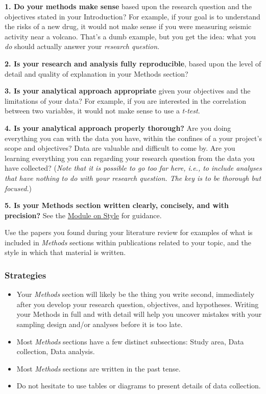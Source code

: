 \documentclass[]{book}
\begin{document}
\textbf{1. Do your methods make sense} based upon the research question and the objectives stated in your Introduction? For example, if your goal is to understand the risks of a new drug, it would not make sense if you were measuring seismic activity near a volcano. That's a dumb example, but you get the idea: what you \emph{do} should actually answer your \emph{research question}.

\textbf{2. Is your research and analysis fully reproducible}, based upon the level of detail and quality of explanation in your Methods section?

\textbf{3. Is your analytical approach appropriate} given your objectives and the limitations of your data? For example, if you are interested in the correlation between two variables, it would not make sense to use a \emph{t-test}.

\textbf{4. Is your analytical approach properly thorough?} Are you doing everything you can with the data you have, within the confines of a your project's scope and objectives? Data are valuable and difficult to come by. Are you learning everything you can regarding your research question from the data you have collected? (\emph{Note that it is possible to go too far here, i.e., to include analyses that have nothing to do with your research question. The key is to be thorough but focused.})

\textbf{5. Is your Methods section written clearly, concisely, and with precision?} See the \protect\hyperlink{style}{Module on Style} for guidance.

Use the papers you found during your literature review for examples of what is included in \emph{Methods} sections within publications related to your topic, and the style in which that material is written.

\hypertarget{strategies-2}{%
\subsubsection*{Strategies}\label{strategies-2}}

\begin{itemize}
\item
  Your \emph{Methods} section will likely be the thing you write second, immediately after you develop your research question, objectives, and hypotheses. Writing your Methods in full and with detail will help you uncover mistakes with your sampling design and/or analyses before it is too late.
\item
  Most \emph{Methods} sections have a few distinct subsections: Study area, Data collection, Data analysis.
\item
  Most \emph{Methods} sections are written in the past tense.
\item
  Do not hesitate to use tables or diagrams to present details of data collection.
\end{itemize}
\end{document}
